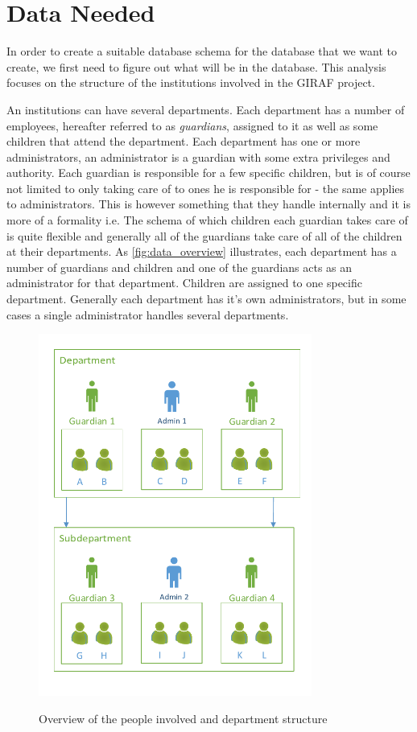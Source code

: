 \section{Data Needed}
In order to create a suitable database schema for the database that we want to create, we first need to figure out what will be in the database. This analysis focuses on the structure of the institutions involved in the GIRAF project. 

An institutions can have several departments. Each department has a number of employees, hereafter referred to as \emph{guardians}, assigned to it as well as some children that attend the department. Each department has one or more administrators, an administrator is a guardian with some extra privileges and authority. Each guardian is responsible for a few specific children, but is of course not limited to only taking care of to ones he is responsible for - the same applies to administrators. This is however something that they handle internally and it is more of a formality i.e. The schema of which children each guardian takes care of is quite flexible and generally all of the guardians take care of all of the children at their departments. As \autoref{fig:data_overview} illustrates, each department has a number of guardians and children and one of the guardians acts as an administrator for that department. Children are assigned to one specific department. Generally each department has it's own administrators, but in some cases a single administrator handles several departments.

\begin{figure}[hptb]
	\begin{center}
	\includegraphics[width=0.8\textwidth]{img/data_overview.pdf}
	\label{fig:data_overview}
	\caption{Overview of the people involved and department structure}
	\end{center}
\end{figure} 


